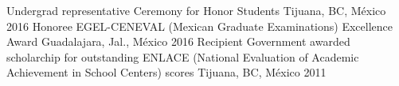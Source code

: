 \begin{cvhonors}
  \cvhonor
    {Undergrad representative}
    {Ceremony for Honor Students}
    {Tijuana, BC, México}
    {2016}
  \cvhonor
    {Honoree}
    {EGEL-CENEVAL (Mexican Graduate Examinations) Excellence Award}
    {Guadalajara, Jal., México}
    {2016}
  \cvhonor
    {Recipient}
    {Government awarded scholarchip for outstanding ENLACE (National Evaluation of Academic Achievement in School Centers) scores}
    {Tijuana, BC, México}
    {2011}
\end{cvhonors}
